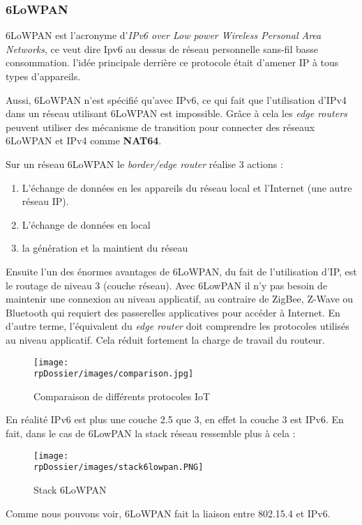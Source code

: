 \subsubsection{6LoWPAN}

6LoWPAN est l'acronyme d'\textit{IPv6 over Low power Wireless Personal Area Networks}, ce veut dire Ipv6 au dessus de réseau personnelle sans-fil basse consommation. l'idée principale derrière ce protocole était d'amener IP à tous types d'appareils. 

Aussi, 6LoWPAN n'est spécifié qu'avec IPv6, ce qui fait que l'utilisation d'IPv4 dans un réseau utilisant 6LoWPAN est impossible. Grâce à cela les \textit{edge routers} peuvent utiliser des mécanisme de transition pour connecter des réseaux 6LoWPAN et IPv4 comme \textbf{NAT64}.

Sur un réseau 6LoWPAN le \textit{border/edge router} réalise 3 actions :

\begin{enumerate}
\item L'échange de données en les appareils du réseau local et l'Internet (une autre réseau IP).
\item L'échange de données en local
\item la génération et la maintient du réseau
\end{enumerate}

Ensuite l'un des énormes avantages de 6LoWPAN, du fait de l'utilisation d'IP, est le routage de niveau 3 (couche réseau). Avec 6LowPAN il n'y pas besoin de maintenir une connexion au niveau applicatif, au contraire de ZigBee, Z-Wave ou Bluetooth qui requiert des passerelles applicatives pour accéder à Internet. En d'autre terme, l'équivalent du \textit{edge router} doit comprendre les protocoles utilisés au niveau applicatif. Cela réduit fortement la charge de travail du routeur.

\begin{figure}[H]
\centering
\texttt{[image: \\rpDossier/images/comparison.jpg]}
\caption{Comparaison de différents protocoles IoT}
\label{comparison}
\end{figure}

En réalité IPv6 est plus une couche 2.5 que 3, en effet la couche 3 est IPv6. En fait, dans le cas de 6LowPAN la stack réseau ressemble plus à cela :

\begin{figure}[H]
\centering
\texttt{[image: \\rpDossier/images/stack6lowpan.PNG]}
\caption{Stack 6LoWPAN}
\label{stack6lowpan}
\end{figure}

Comme nous pouvons voir, 6LoWPAN fait la liaison entre 802.15.4 et IPv6.


